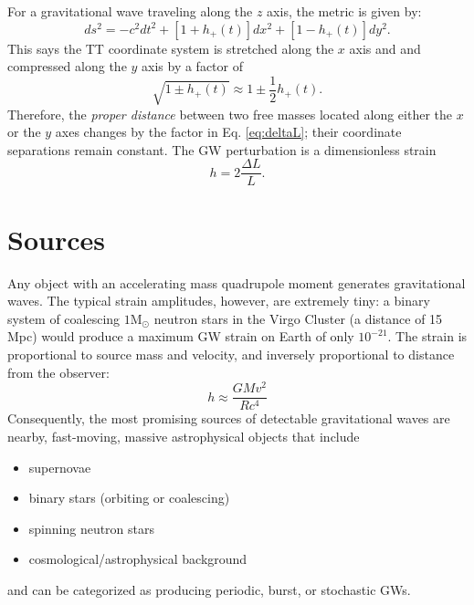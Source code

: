 For a gravitational wave traveling along the $z$ axis, the metric is
given by:
\begin{equation}
ds^2 = -c^2dt^2 + [1+h_+(t)] dx^2 + [1-h_+(t)] dy^2.
\end{equation}
This says the TT coordinate system is stretched along the $x$ axis and
and compressed along the $y$ axis by a factor of 
\begin{equation}
\sqrt{1 \pm h_+(t)} \approx 1 \pm \frac{1}{2} h_+(t).
\label{eq:deltaL}
\end{equation}
Therefore, the \emph{proper distance} between two free masses located
along either the $x$ or the $y$ axes changes by the factor in
Eq. \ref{eq:deltaL}; their coordinate separations remain constant. The
GW perturbation is a dimensionless strain
\begin{equation}
h = 2 \frac{\Delta L}{L}.
\end{equation}



\section{Sources}
Any object with an accelerating mass quadrupole moment generates
gravitational waves. The typical strain amplitudes, however, are
extremely tiny: a binary system of coalescing $1 \mbox{M}_\odot$
neutron stars in the Virgo Cluster (a distance of 15 Mpc) would
produce a maximum GW strain on Earth of only $10^{-21}$. The strain is
proportional to source mass and velocity, and inversely proportional
to distance from the observer:
\begin{equation}
h \approx \frac{GMv^2}{Rc^4}
\end{equation}
Consequently, the most promising sources of detectable gravitational
waves are nearby, fast-moving, massive astrophysical objects that
include
\begin{itemize}
\item supernovae \vspace{-10pt}
\item binary stars (orbiting or coalescing) \vspace{-10pt}
\item spinning neutron stars \vspace{-10pt}
\item cosmological/astrophysical background
\end{itemize}
and can be categorized as producing periodic, burst, or stochastic GWs.

